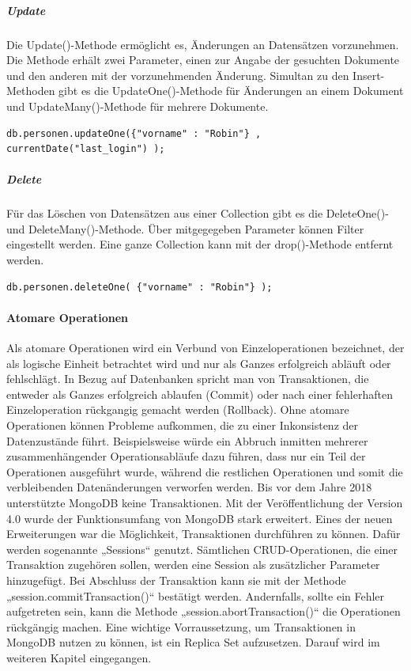 \subparagraph{Update}
Die Update()-Methode ermöglicht es, Änderungen an Datensätzen vorzunehmen.  Die Methode erhält zwei Parameter, einen zur Angabe der gesuchten Dokumente und den anderen mit  der vorzunehmenden Änderung. Simultan zu den Insert-Methoden gibt es die UpdateOne()-Methode für Änderungen an einem Dokument und UpdateMany()-Methode für mehrere Dokumente.
\newline

\begin{lstlisting}[caption=MongoDB Update, label=lst:MongoDBUpdate]
db.personen.updateOne({"vorname" : "Robin"} , currentDate("last_login") );

\end{lstlisting}

\subparagraph{Delete}
Für das Löschen von Datensätzen aus einer Collection gibt es die DeleteOne()- und DeleteMany()-Methode. Über mitgegegeben Parameter können Filter eingestellt werden. Eine ganze Collection kann mit der drop()-Methode entfernt werden.
\newline

\begin{lstlisting}[caption=MongoDB Remove, label=lst:MongoDBRemove]
db.personen.deleteOne( {"vorname" : "Robin"} );

\end{lstlisting}

\paragraph{Atomare Operationen}
Als atomare Operationen wird ein Verbund von Einzeloperationen bezeichnet, der als logische Einheit betrachtet wird und nur als Ganzes erfolgreich abläuft oder fehlschlägt. In Bezug auf Datenbanken spricht man von Transaktionen, die entweder als Ganzes erfolgreich ablaufen (Commit) oder nach einer fehlerhaften Einzeloperation rückgangig gemacht werden (Rollback). Ohne atomare Operationen können Probleme aufkommen, die zu einer Inkonsistenz der Datenzustände führt. Beispielsweise würde ein Abbruch inmitten mehrerer zusammenhängender Operationsabläufe dazu führen,  dass nur ein Teil der Operationen ausgeführt wurde, während die restlichen Operationen und somit die verbleibenden Datenänderungen verworfen werden.
\newline
Bis vor dem Jahre 2018 unterstützte MongoDB keine Transaktionen. Mit der Veröffentlichung der Version 4.0 wurde der Funktionsumfang von MongoDB stark erweitert. Eines der neuen Erweiterungen war die Möglichkeit, Transaktionen durchführen zu können. Dafür werden sogenannte „Sessions“ genutzt. Sämtlichen CRUD-Operationen, die einer Transaktion zugehören sollen, werden eine Session als zusätzlicher Parameter hinzugefügt.  Bei Abschluss der Transaktion kann sie mit der Methode „session.commitTransaction()“ bestätigt werden. Andernfalls, sollte ein Fehler aufgetreten sein, kann die Methode „session.abortTransaction()“ die Operationen rückgängig machen. Eine wichtige Vorraussetzung, um Transaktionen in MongoDB nutzen zu können, ist ein Replica Set aufzusetzen. Darauf wird im weiteren Kapitel eingegangen. 
\newline

